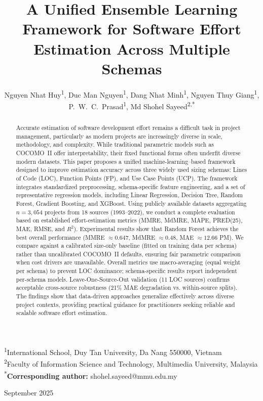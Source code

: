 \documentclass[11pt,a4paper]{article}
\title{\textbf{A Unified Ensemble Learning Framework for Software Effort Estimation Across Multiple Schemas}}
\author{
Nguyen Nhat Huy\textsuperscript{1},
Duc Man Nguyen\textsuperscript{1},
Dang Nhat Minh\textsuperscript{1},
Nguyen Thuy Giang\textsuperscript{1},
P.~W.~C.~Prasad\textsuperscript{1},
Md Shohel Sayeed\textsuperscript{2,*}
}
\date{}
\begin{document}
\maketitle

\begin{center}
\textsuperscript{1}International School, Duy Tan University, Da Nang 550000, Vietnam\\
\textsuperscript{2}Faculty of Information Science and Technology, Multimedia University, Malaysia\\
\textsuperscript{*}\textbf{Corresponding author:} shohel.sayeed@mmu.edu.my
\end{center}

\begin{center}
September 2025
\end{center}
\begin{abstract}
Accurate estimation of software development effort remains a difficult task in project management, particularly as modern projects are increasingly diverse in scale, methodology, and complexity. While traditional parametric models such as COCOMO~II offer interpretability, their fixed functional forms often underfit diverse modern datasets. This paper proposes a unified machine-learning--based framework designed to improve estimation accuracy across three widely used sizing schemas: Lines of Code (LOC), Function Points (FP), and Use Case Points (UCP). The framework integrates standardized preprocessing, schema-specific feature engineering, and a set of representative regression models, including Linear Regression, Decision Tree, Random Forest, Gradient Boosting, and XGBoost. Using publicly available datasets aggregating $n=3{,}054$ projects from 18 sources (1993--2022), we conduct a complete evaluation based on established effort-estimation metrics (MMRE, MdMRE, MAPE, PRED(25), MAE, RMSE, and $R^2$). Experimental results show that Random Forest achieves the best overall performance (MMRE $\approx 0.647$, MdMRE $\approx 0.48$, MAE $\approx 12.66$ PM). We compare against a calibrated size-only baseline (fitted on training data per schema) rather than uncalibrated COCOMO~II defaults, ensuring fair parametric comparison when cost drivers are unavailable. Overall metrics use macro-averaging (equal weight per schema) to prevent LOC dominance; schema-specific results report independent per-schema models. Leave-One-Source-Out validation (11 LOC sources) confirms acceptable cross-source robustness (21\% MAE degradation vs. within-source splits). The findings show that data-driven approaches generalize effectively across diverse project contexts, providing practical guidance for practitioners seeking reliable and scalable software effort estimation.
\end{abstract}
\end{document}
